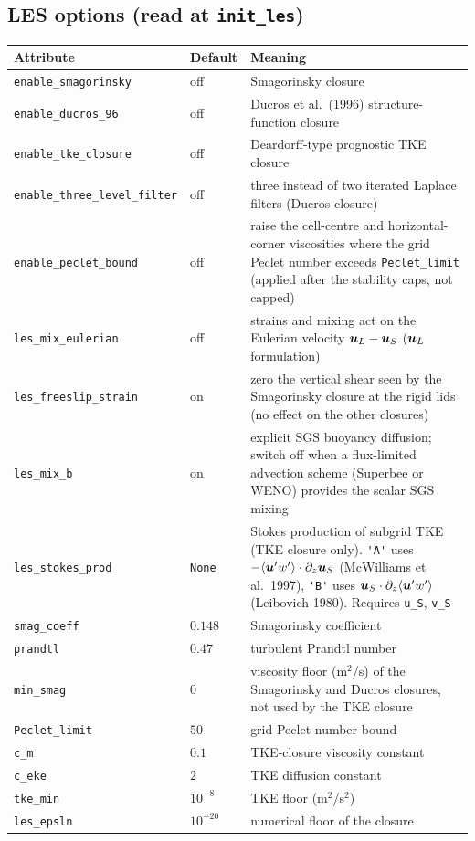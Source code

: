 \documentclass[12pt]{article}
\renewcommand{\v}[1]{{\mbox{\boldmath$ #1 $}}}  %
\newcommand{\pz}[1]{{\partial_z #1}}
\begin{document}
\subsection*{LES options (read at \texttt{init\_les})}

\begin{longtable}{@{}llp{7.9cm}@{}}
\hline
Attribute & Default & Meaning \\
\hline
\endhead
\verb|enable_smagorinsky| & off & Smagorinsky closure \\
\verb|enable_ducros_96| & off & Ducros et al.\ (1996)
  structure-function closure \\
\verb|enable_tke_closure| & off & Deardorff-type prognostic TKE closure \\
\verb|enable_three_level_filter| & off & three instead of two iterated
  Laplace filters (Ducros closure) \\
\verb|enable_peclet_bound| & off & raise the cell-centre and
  horizontal-corner viscosities where the grid Peclet number exceeds
  \verb|Peclet_limit| (applied after the stability caps, not capped) \\
\verb|les_mix_eulerian| & off & strains and mixing act on the Eulerian
  velocity $\v u_L - \v u_S$ ($\v u_L$ formulation) \\
\verb|les_freeslip_strain| & on & zero the vertical shear seen by the
  Smagorinsky closure at the rigid lids (no effect on the other
  closures) \\
\verb|les_mix_b| & on & explicit SGS buoyancy diffusion; switch off when a
  flux-limited advection scheme (Superbee or WENO) provides the scalar SGS
  mixing \\
\verb|les_stokes_prod| & \verb|None| & Stokes production of subgrid TKE
  (TKE closure only). \verb|'A'| uses
  $-\langle \v u' w' \rangle \cdot \pz{\v u_S}$ (McWilliams et al.\ 1997),
  \verb|'B'| uses $\v u_S \cdot \pz{\langle \v u' w' \rangle}$
  (Leibovich 1980). Requires \verb|u_S|, \verb|v_S| \\
\verb|smag_coeff| & $0.148$ & Smagorinsky coefficient \\
\verb|prandtl| & $0.47$ & turbulent Prandtl number \\
\verb|min_smag| & $0$ & viscosity floor (m$^2$/s) of the Smagorinsky and
  Ducros closures, not used by the TKE closure \\
\verb|Peclet_limit| & $50$ & grid Peclet number bound \\
\verb|c_m| & $0.1$ & TKE-closure viscosity constant \\
\verb|c_eke| & $2$ & TKE diffusion constant \\
\verb|tke_min| & $10^{-8}$ & TKE floor (m$^2$/s$^2$) \\
\verb|les_epsln| & $10^{-20}$ & numerical floor of the closure \\
\hline
\end{longtable}
\end{document}
